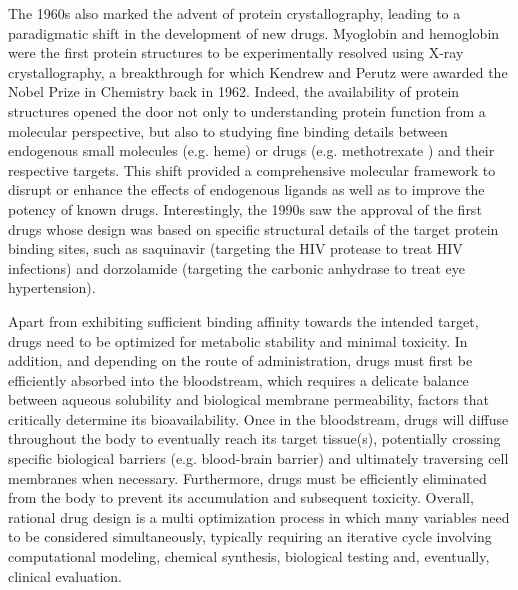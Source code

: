 The 1960s also marked the advent of protein crystallography, leading to a paradigmatic shift in the development of new drugs. Myoglobin and hemoglobin were the first protein structures to be experimentally resolved using X-ray crystallography, a breakthrough for which Kendrew and Perutz were awarded the Nobel Prize in Chemistry back in 1962\cite{kendrew_three-dimensional_1958, muirhead_structure_1963}. Indeed, the availability of protein structures opened the door not only to understanding protein function from a molecular perspective, but also to studying fine binding details between endogenous small molecules (e.g. heme\cite{kendrew_three-dimensional_1958, muirhead_structure_1963}) or drugs (e.g. methotrexate \cite{bolin_crystal_1982}) and their respective targets. This shift provided a comprehensive molecular framework to disrupt or enhance the effects of endogenous ligands as well as to improve the potency of known drugs. Interestingly, the 1990s saw the approval of the first drugs whose design was based on specific structural details of the target protein binding sites, such as saquinavir (targeting the HIV protease to treat HIV infections) and dorzolamide (targeting the carbonic anhydrase to treat eye hypertension)\cite{rondeau_protein_2008, leelananda_computational_2016}. 

Apart from exhibiting sufficient binding affinity towards the intended target, drugs need to be optimized for metabolic stability and minimal toxicity. In addition, and depending on the route of administration, drugs must first be efficiently absorbed into the bloodstream, which requires a delicate balance between aqueous solubility and biological membrane permeability, factors that critically determine its bioavailability. Once in the bloodstream, drugs will diffuse throughout the body to eventually reach its target tissue(s), potentially crossing specific biological barriers (e.g. blood-brain barrier) and ultimately traversing cell membranes when necessary. Furthermore, drugs must be efficiently eliminated from the body to prevent its accumulation and subsequent toxicity. Overall, rational drug design is a multi optimization process in which many variables need to be considered simultaneously, typically requiring an iterative cycle involving computational modeling, chemical synthesis, biological testing and, eventually, clinical evaluation\cite{waring_analysis_2015, patrick_introduction_2023}. 

